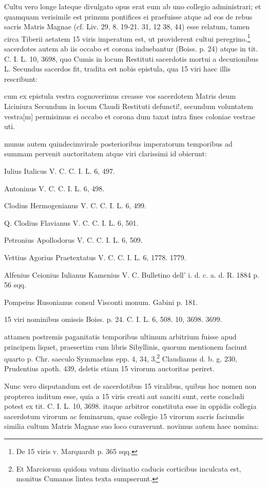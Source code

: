\documentclass[a4paper, 11pt, oneside, polutonikogreek, german]{article}
\begin{document}
Cultu vero longe lateque divulgato opus erat eum ab uno collegio administrari; et quamquam verisimile est primum pontifices ei praefuisse atque ad eos de rebus sacris Matris Magnae (cf. Liv. 29, 8. 19-21. 31, 12 38, 44) esse relatum, tamen circa Tiberii aetatem 15 viris imperatum est, ut providerent cultui peregrino.\footnote{De 15 viris v. Marquardt p. 365 sqq.} sacerdotes autem ab iis occabo et corona induebantur (Boiss. p. 24) atque in tit. C. I. L. 10, 3698, quo Cumis in locum Restituti sacerdotis mortui a decurionibus L. Secundus sacerdos fit, tradita est nobis epistula, qua 15 viri haec illis rescribunt:

cum ex epistula vestra cognoverimus creasse vos sacerdotem Matris deum Liciniura Secundum in locum Claudi Restituti defuncti!, secundum voluntatem vestra[m] permisimus ei occabo et corona dum taxat intra fines coloniae vestrae uti.

munus autem quindecimvirale posterioribus imperatorum temporibus ad summam pervenit auctoritatem atque viri clarissimi id obierunt:

Iulius Italicus V. C. C. I. L. 6, 497.

Antoninus V. C. C. I. L. 6, 498.

Clodius Hermogenianus V. C. C. I. L. 6, 499.

Q. Clodius Flavianus V. C. C. I. L. 6, 501.

Petronius Apollodorus V. C. C. I. L. 6, 509.

Vettius Agorius Praetextatus V. C. C. I. L. 6, 1778. 1779.

Alfenius Ceionius Iulianus Kamenius V. C. Bulletino dell' i. d. c. a. d. R. 1884 p. 56 sqq.

Pompeius Rusonianus consul Visconti monum. Gabini p. 181.

15 viri nominibus omissis Boiss. p. 24. C. I. L. 6, 508. 10, 3698. 3699.

attamen postremis paganitatis temporibus ultimum arbitrium fuisse apud principem liquet, praesertim cum libris Sibyllinis, quorum mentionem faciunt quarto p. Chr. saeculo Symmachus epp. 4, 34, 3,\footnote{Et Marciorum quidom vatum divinatio caducis corticibus inculcata est, monitus Cumanos lintea texta sumpserunt.} Claudianus d. b. g. 230, Prudentius apoth. 439, deletis etiam 15 virorum auctoritas periret.

Nunc vero disputandum est de sacerdotibus 15 viralibus, quibus hoc nomen non propterea inditum esse, quia a 15 viris creati aut sanciti sunt, certe concludi potest ex tit. C. I. L. 10, 3698. itaque arbitror constituta esse in oppidis collegia sacerdotum virorum ac feminarum, quae collegio 15 virorum sacris faciundis similia cultum Matris Magnae suo loco curaverunt. novimus autem haec nomina:
\end{document}
